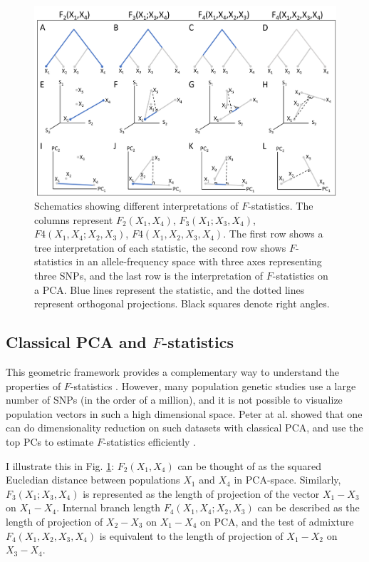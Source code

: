 \documentclass[12pt]{article}
\begin{document}
\begin{figure}[ht!]
    \includegraphics[width=16.5cm]{Images/ppca/Figures/overview.png}
    \centering
    \caption{Schematics showing different interpretations of $F$-statistics. The columns represent $F_2(X_1,X_4)$, $F_3(X_1;X_3,X_4)$, $F4(X_1,X_4;X_2,X_3)$, $F4(X_1,X_2,X_3,X_4)$. The first row shows a tree interpretation of each statistic, the second row shows $F$-statistics in an allele-frequency space with three axes representing three SNPs, and the last row is the interpretation of $F$-statistics on a PCA. Blue lines represent the statistic, and the dotted lines represent orthogonal projections. Black squares denote right angles.}
    \label{fig2:overview}
\end{figure}


\subsection{Classical PCA and $F$-statistics}\label{theory-pca-fstats}

This geometric framework provides a complementary way to understand the properties of $F$-statistics \citep{oteo-garcia_geometrical_2021}. However, many population genetic studies use a large number of SNPs (in the order of a million), and it is not possible to visualize population vectors in such a high dimensional space. Peter at al. showed that one can do dimensionality reduction on such datasets with classical PCA, and use the top PCs to estimate $F$-statistics efficiently \citep{peter_geometric_2022}.

I illustrate this in Fig. \ref{fig2:overview}:  $F_2(X_1,X_4)$ can be thought of as the squared Eucledian distance between populations $X_1$ and $X_4$ in PCA-space. Similarly, $F_3(X_1;X_3,X_4)$ is represented as the length of projection of the vector $X_1-X_3$ on $X_1-X_4$. Internal branch length $F_4(X_1,X_4;X_2,X_3)$ can be described as the length of projection of $X_2-X_3$ on $X_1-X_4$ on PCA, and the test of admixture $F_4(X_1,X_2,X_3,X_4)$ is equivalent to the length of projection of $X_1-X_2$ on $X_3-X_4$. 
\end{document}
